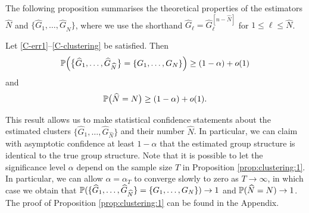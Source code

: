 \documentclass[a4paper,12pt]{article}
\begin{document}
The following proposition summarises the theoretical properties of the estimators $\widehat{N}$ and $\{ \widehat{G}_1,\ldots,\widehat{G}_{\widehat{N}} \}$, where we use the shorthand $\widehat{G}_\ell = \widehat{G}_\ell^{[n-\widehat{N}]}$ for $1 \le \ell \le \widehat{N}$. 
\begin{prop}\label{prop:clustering:1}
Let \ref{C-err1}--\ref{C-clustering} be satisfied. Then 
\[ \mathbb{P} \Big( \big\{ \widehat{G}_1,\ldots,\widehat{G}_{\widehat{N}} \big\} = \{ G_1,\ldots, G_N \} \Big) \ge (1-\alpha) + o(1) \]
and 
\[ \mathbb{P} \big( \widehat{N} = N \big) \ge (1-\alpha) + o(1). \]
\end{prop}
This result allows us to make statistical confidence statements about the estimated clusters $\{ \widehat{G}_1,\ldots,\widehat{G}_{\widehat{N}} \}$ and their number $\widehat{N}$. In particular, we can claim with asymptotic confidence at least $1 - \alpha$ that the estimated group structure is identical to the true group structure. Note that it is possible to let the significance level $\alpha$ depend on the sample size $T$ in Proposition \ref{prop:clustering:1}. In particular, we can allow $\alpha = \alpha_T$ to converge slowly to zero as $T \rightarrow \infty$, in which case we obtain that $\mathbb{P} ( \{ \widehat{G}_1,\ldots,\widehat{G}_{\widehat{N}} \} = \{ G_1,\ldots, G_N \} ) \rightarrow 1$ and $\mathbb{P} ( \widehat{N} = N ) \rightarrow 1$. The proof of Proposition \ref{prop:clustering:1} can be found in the Appendix.
\end{document}
